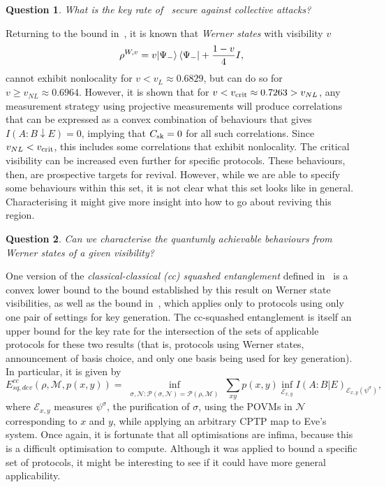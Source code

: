 \documentclass[10pt, a4paper]{article}
\numberwithin{equation}{section} %
\theoremstyle{definition}
\theoremstyle{plain}
\newtheorem{question}{Question}
\newcommand{\?}{\mathrel{?}} %
\newcommand{\sM}{\mathcal{M}}
\newcommand{\sN}{\mathcal{N}}
\newcommand{\cE}{\mathcal{E}}
\newcommand{\cP}{\mathcal{P}}
\newcommand{\sk}{\rm sk}
\newcommand{\crit}{\rm crit}
\begin{document}
      \begin{question}
        What is the key rate of~\cite{NonstandardProtocol} secure against collective attacks?
      \end{question}

      Returning to the bound in~\cite{NotSufficient}, it is known that \emph{Werner states} with visibility \(v\)
      \begin{equation}
        \rho^{W,v} = v{\ket{\Psi_-}\bra{\Psi_-}} + \frac{1-v}{4}I,
      \end{equation}
      cannot exhibit nonlocality for \(v < v_L \approx 0.6829\), but can do so for \(v \geq v_{NL} \approx 0.6964\). However, it is shown that for \(v < v_{\crit} \approx 0.7263 > v_{NL}\), any measurement strategy using projective measurements will produce correlations that can be expressed as a convex combination of behaviours that gives \(I(A:B \downarrow E) = 0\), implying that \(C_{\sk} = 0\) for all such correlations. Since \(v_{NL} < v_{\crit}\), this includes some correlations that exhibit nonlocality. The critical visibility can be increased even further for specific protocols. These behaviours, then, are prospective targets for revival. However, while we are able to specify some behaviours within this set, it is not clear what this set looks like in general. Characterising it might give more insight into how to go about reviving this region.

      \begin{question}
        Can we characterise the quantumly achievable behaviours from Werner states of a given visibility?
      \end{question}

      One version of the \emph{classical-classical (cc) squashed entanglement} defined in~\cite{CCSquashedEntangle} is a convex lower bound to the bound established by this result on Werner state visibilities, as well as the bound in~\cite{RevisedPeres}, which applies only to protocols using only one pair of settings for key generation. The cc-squashed entanglement is itself an upper bound for the key rate for the intersection of the sets of applicable protocols for these two results (that is, protocols using Werner states, announcement of basis choice, and only one basis being used for key generation). In particular, it is given by
      \begin{equation}
        E^{cc}_{sq,dev}(\rho, \sM, p(x,y)) = \inf_{\substack{\sigma, \sN : \cP(\sigma, \sN) = \cP(\rho, \sM)}} \sum_{xy} p(x,y) \inf_{\cE_{x,y}} I{(A : B|E)}_{\cE_{x,y}(\psi^{\sigma})},
      \end{equation}
      where \(\cE_{x,y}\) measures \(\psi^\sigma\), the purification of \({\sigma}\), using the POVMs in \(\sN\) corresponding to \(x\) and \(y\), while applying an arbitrary CPTP map to Eve's system. Once again, it is fortunate that all optimisations are infima, because this is a difficult optimisation to compute. Although it was applied to bound a specific set of protocols, it might be interesting to see if it could have more general applicability.
\end{document}
